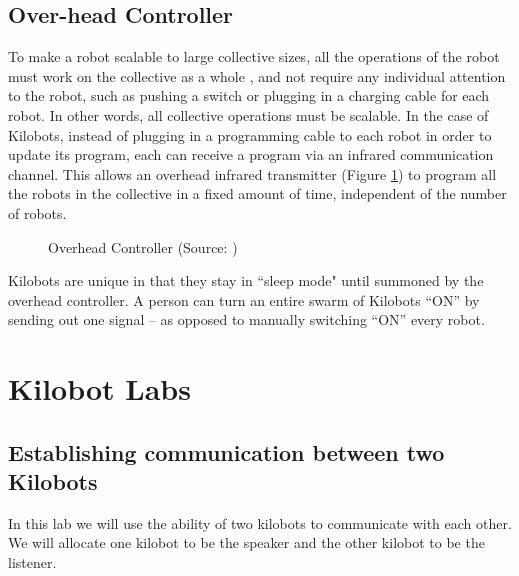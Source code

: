 \documentclass{report}[12pt]
\begin{document}
\section{Over-head Controller}
To make a robot scalable to large collective sizes, all the operations of the robot must work on the collective as a whole \cite{mclurkin2006speaking}, and not require any individual attention to the robot, such as pushing a switch or plugging in a charging cable for each robot. In other words, all collective operations must be scalable. In the case of Kilobots, instead of plugging in a programming
cable to each robot in order to update its program, each can
receive a program via an infrared communication channel.
This allows an overhead infrared transmitter  (Figure \ref{fig:ohc}) to program all
the robots in the collective in a fixed amount of time, independent of the number of robots. 

\begin{figure}
    \centering
	\caption{Overhead Controller (Source: \cite{kilobotics_manual})}
	\label{fig:ohc}
\end{figure}
\noindent Kilobots are unique in that they stay in ``sleep mode" until summoned by the overhead controller. A person can turn an entire swarm of Kilobots ``ON'' by sending out one signal -- as opposed to manually switching ``ON'' every robot.

\chapter{Kilobot Labs}

\section{Establishing communication between two Kilobots}
In this lab we will use the ability of two kilobots to communicate with each other. We will allocate one kilobot to be the speaker and the other kilobot to be the listener.
\end{document}
